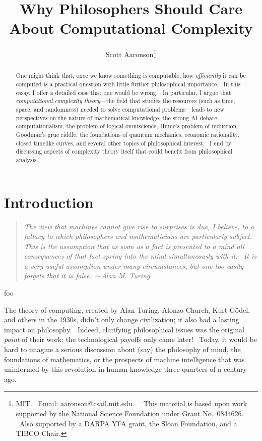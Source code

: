\documentclass[12pt,onecolumn]{article}%
\begin{document}
\title{Why Philosophers Should Care About Computational Complexity}
\author{Scott Aaronson\thanks{MIT. \ Email: aaronson@csail.mit.edu. \ \ This material
is based upon work supported by the National Science Foundation under Grant
No.\ 0844626. \ Also supported by a DARPA YFA grant, the Sloan Foundation, and
a TIBCO Chair.}}
\date{}
\maketitle

\begin{abstract}
One might think that, once we know something is computable, how
\textit{efficiently} it can be computed is a practical question with little
further philosophical importance. \ In this essay, I offer a detailed case
that one would be wrong. \ In particular, I argue that \textit{computational
complexity theory}---the field that studies the resources (such as time,
space, and randomness) needed to solve computational problems---leads to new
perspectives on the nature of mathematical knowledge, the strong AI debate,
computationalism, the problem of logical omniscience, Hume's problem of
induction, Goodman's grue riddle, the foundations of quantum mechanics,
economic rationality, closed timelike curves, and several other topics of
philosophical interest. \ I end by discussing aspects of complexity theory
itself that could benefit from philosophical analysis.

\end{abstract}
\tableofcontents

\newpage
\section{Introduction\label{INTRO}}

\begin{quotation}
\noindent\textit{The view that machines cannot give rise to surprises is due,
I believe, to a fallacy to which philosophers and mathematicians are
particularly subject. This is the assumption that as soon as a fact is
presented to a mind all consequences of that fact spring into the mind
simultaneously with it. \ It is a very useful assumption under many
circumstances, but one too easily forgets that it is false. ---Alan M. Turing
\cite{turing:ai}}
\end{quotation}

{\sf foo}

The theory of computing, created by Alan Turing, Alonzo Church, Kurt
G\"{o}del, and others in the 1930s, didn't only change civilization; it also
had a lasting impact on philosophy. \ Indeed, clarifying philosophical issues
was the original \textit{point} of their work; the technological payoffs only
came later! \ Today, it would be hard to imagine a serious discussion about
(say) the philosophy of mind, the foundations of mathematics, or the prospects
of machine intelligence that was uninformed by this revolution in human
knowledge three-quarters of a century ago.
\end{document}
